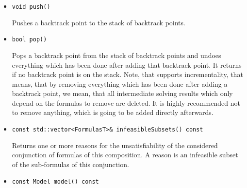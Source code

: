 \begin{itemize}
	but for NRA it is actually always possible to define a strategy for a complete \smtrat solver) or it
	communicates lemmas/tautologies, which can be obtained applying \texttt{lemmas()}. 
	If we embed, e.g., a theory solver composed with \smtrat into an
	SMT solver, these lemmas can be used in its SAT solving process in the same way as infeasible subsets are 
	used. The strategy of an SMT solver composed with \smtrat has to involve a \satModule before any theory module
	is used\footnote{It is possible to define a strategy using conditions in a way, that we achieve an SMT solver, even if for some cases no \satModule is involved before a theory module is applied.} and, therefore, the SMT solver never communicates these lemmas as they are already processed by the
	\satModule. A better explanation on the modules and the strategy can be found in Chapter~\ref{chapter:generalframework} 
	and Chapter~\ref{chapter:composingats}. If the Boolean argument of the function \texttt{check} is \false, the composed solver is allowed to omit hard obstacles during solving at the cost of returning \UNKNOWN in more cases.
     \item \begin{verbatim}void push()\end{verbatim}
    	Pushes a backtrack point to the stack of backtrack points.
    \item \begin{verbatim}bool pop()\end{verbatim}
    	Pops a backtrack point from the stack of backtrack points and undoes everything
		which has been done after adding that backtrack point. It returns \false if no backtrack
		point is on the stack. Note, that \smtrat supports incrementality, that means, that by removing
		everything which has been done after adding a backtrack point, we mean, that all 
		intermediate solving results which only depend on the formulas to remove are deleted. It is highly
		recommended not to remove anything, which is going to be added directly afterwards.
    \item \begin{verbatim}const std::vector<FormulasT>& infeasibleSubsets() const\end{verbatim}
    	Returns one or more reasons for the unsatisfiability of the considered conjunction of 
    	formulas of this \smtrat composition. A reason
    	is an infeasible subset of the sub-formulas of this conjunction.
    \item \begin{verbatim}const Model model() const\end{verbatim}

\end{itemize}
